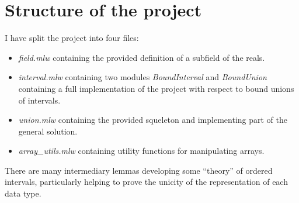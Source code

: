 \section*{Structure of the project}
I have split the project into four files:
\begin{itemize}
  \item \textit{field.mlw} containing the provided definition of a subfield of the
    reals.
  \item \textit{interval.mlw} containing two modules \textit{BoundInterval} and
    \textit{BoundUnion} containing a full implementation of the project with respect
    to bound unions of intervals.
  \item \textit{union.mlw} containing the provided squeleton and implementing part of
    the general solution.
  \item \textit{array\_utils.mlw} containing utility functions for manipulating
    arrays.
\end{itemize}

There are many intermediary lemmas developing some ``theory'' of ordered intervals,
particularly helping to prove the unicity of the representation of each data type.
%
%
